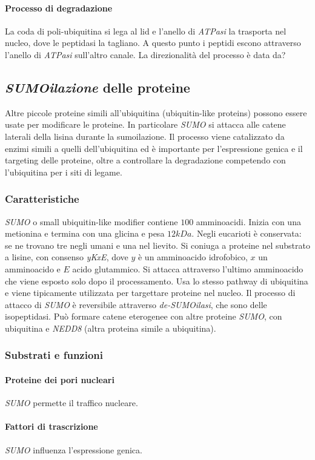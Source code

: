 \paragraph{Processo di degradazione}
La coda di poli-ubiquitina si lega al lid e l'anello di \emph{ATPasi} la trasporta nel nucleo, dove le peptidasi la tagliano. A questo punto i peptidi escono attraverso l'anello di \emph{ATPasi} 
sull'altro canale. La direzionalit\`a del processo \`e data da?
\subsection{\emph{SUMOilazione} delle proteine}
Altre piccole proteine simili all'ubiquitina (ubiquitin-like proteins) possono essere usate per modificare le proteine. In particolare \emph{SUMO} si attacca alle catene laterali della lisina 
durante la sumoilazione. 
Il processo viene catalizzato da enzimi simili a quelli dell'ubiquitina ed \`e importante per l'espressione genica e il targeting delle proteine, oltre a controllare la 
degradazione competendo con l'ubiquitina per i siti di legame. 
\subsubsection{Caratteristiche}
\emph{SUMO} o small ubiquitin-like modifier contiene $100$ amminoacidi. Inizia con una metionina e termina con una glicina e pesa $12kDa$. 
Negli eucarioti \`e conservata: se ne trovano tre negli umani e una nel lievito.
Si coniuga a proteine nel substrato a lisine, con consenso \emph{yKxE}, dove $y$ \`e un amminoacido idrofobico, $x$ un amminoacido e $E$ acido glutammico. 
Si attacca attraverso l'ultimo amminoacido che viene esposto solo dopo il processamento.
Usa lo stesso pathway di ubiquitina e viene tipicamente utilizzata per targettare proteine nel nucleo. 
Il processo di attacco di \emph{SUMO} \`e reversibile attraverso \emph{de-SUMOilasi}, che sono delle isopeptidasi. 
Pu\`o formare catene eterogenee con altre proteine \emph{SUMO}, con ubiquitina e \emph{NEDD8} (altra proteina simile a ubiquitina).
\subsubsection{Substrati e funzioni}
\paragraph{Proteine dei pori nucleari}
\emph{SUMO} permette il traffico nucleare.
\paragraph{Fattori di trascrizione}
\emph{SUMO} influenza l'espressione genica.
